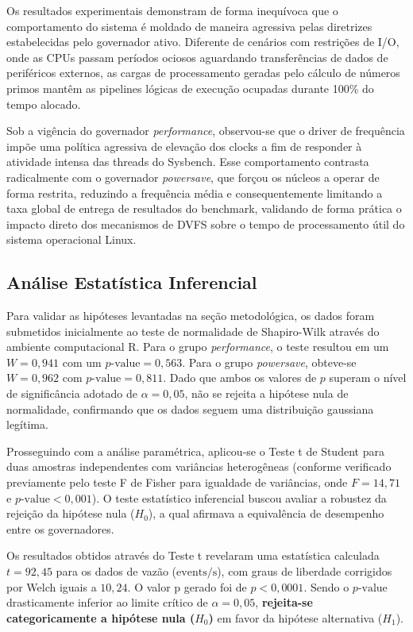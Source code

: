 \documentclass[12pt]{article}
\begin{document}
Os resultados experimentais demonstram de forma inequívoca que o comportamento do sistema é moldado de maneira agressiva pelas diretrizes estabelecidas pelo governador ativo. Diferente de cenários com restrições de I/O, onde as CPUs passam períodos ociosos aguardando transferências de dados de periféricos externos, as cargas de processamento geradas pelo cálculo de números primos mantêm as pipelines lógicas de execução ocupadas durante 100\% do tempo alocado. 

Sob a vigência do governador \textit{performance}, observou-se que o driver de frequência impõe uma política agressiva de elevação dos clocks a fim de responder à atividade intensa das threads do Sysbench. Esse comportamento contrasta radicalmente com o governador \textit{powersave}, que forçou os núcleos a operar de forma restrita, reduzindo a frequência média e consequentemente limitando a taxa global de entrega de resultados do benchmark, validando de forma prática o impacto direto dos mecanismos de DVFS sobre o tempo de processamento útil do sistema operacional Linux.

\subsection{Análise Estatística Inferencial}

Para validar as hipóteses levantadas na seção metodológica, os dados foram submetidos inicialmente ao teste de normalidade de Shapiro-Wilk através do ambiente computacional R. Para o grupo \textit{performance}, o teste resultou em um $W = 0,941$ com um $p\text{-value} = 0,563$. Para o grupo \textit{powersave}, obteve-se $W = 0,962$ com $p\text{-value} = 0,811$. Dado que ambos os valores de $p$ superam o nível de significância adotado de $\alpha = 0,05$, não se rejeita a hipótese nula de normalidade, confirmando que os dados seguem uma distribuição gaussiana legítima.

Prosseguindo com a análise paramétrica, aplicou-se o Teste t de Student para duas amostras independentes com variâncias heterogêneas (conforme verificado previamente pelo teste F de Fisher para igualdade de variâncias, onde $F = 14,71$ e $p\text{-value} < 0,001$). O teste estatístico inferencial buscou avaliar a robustez da rejeição da hipótese nula ($H_0$), a qual afirmava a equivalência de desempenho entre os governadores.

Os resultados obtidos através do Teste t revelaram uma estatística calculada $t = 92,45$ para os dados de vazão ($\text{events/s}$), com graus de liberdade corrigidos por Welch iguais a $10,24$. O valor p gerado foi de $p < 0,0001$. Sendo o $p\text{-value}$ drasticamente inferior ao limite crítico de $\alpha = 0,05$, \textbf{rejeita-se categoricamente a hipótese nula ($H_0$)} em favor da hipótese alternativa ($H_1$). 
\end{document}
